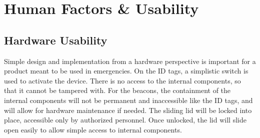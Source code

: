 

\setcounter{section}{4}
\section{Human Factors \& Usability}
\bigskip

\subsection{Hardware Usability}

Simple design and implementation from a hardware perspective is important for a product meant to be used in emergencies. On the ID tags, a simplistic switch is used to activate the device. There is no access to the internal components, so that it cannot be tampered with. For the beacons, the containment of the internal components will not be permanent and inaccessible like the ID tags, and will allow for hardware maintenance if needed. The sliding lid will be locked into place, accessible only by authorized personnel. Once unlocked, the lid will slide open easily to allow simple access to internal components.